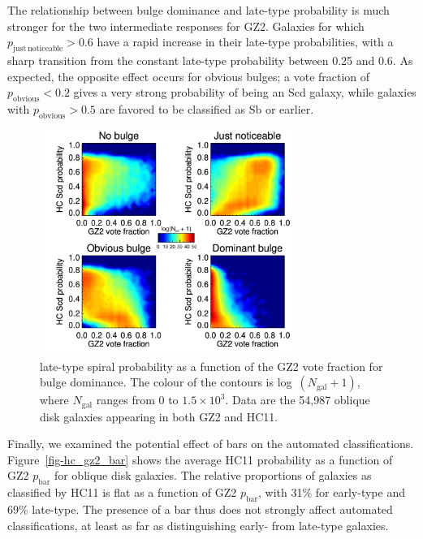 \documentclass[useAMS,usenatbib]{mn2e}
\begin{document}
The relationship between bulge dominance and late-type probability is much stronger for the two intermediate responses for GZ2. Galaxies for which $p_\mathrm{just~noticeable}>0.6$ have a rapid increase in their late-type probabilities, with a sharp transition from the constant late-type probability between 0.25 and 0.6. As expected, the opposite effect occurs for obvious bulges; a vote fraction of $p_\mathrm{obvious}<0.2$ gives a very strong probability of being an Scd galaxy, while galaxies with $p_\mathrm{obvious}>0.5$ are favored to be classified as Sb or earlier. 

\begin{figure}
\includegraphics[angle=0,width=3.3in]{figures/hc_gz2_bulge_contour.pdf}
\caption{\citet{hue11} late-type spiral probability as a function of the GZ2 vote fraction for bulge dominance. The colour of the contours is log~$(N_\mathrm{gal} + 1)$, where $N_\mathrm{gal}$ ranges from 0 to $1.5\times10^3$. Data are the 54,987 oblique disk galaxies appearing in both GZ2 and HC11.
\label{fig-hc_gz2_bulge_contour}}
\end{figure}

Finally, we examined the potential effect of bars on the automated classifications. Figure~\ref{fig-hc_gz2_bar} shows the average HC11 probability as a function of GZ2 $p_\mathrm{bar}$ for oblique disk galaxies. The relative proportions of galaxies as classified by HC11 is flat as a function of GZ2 $p_\mathrm{bar}$, with 31\% for early-type and 69\% late-type. The presence of a bar thus does not strongly affect automated classifications, at least as far as distinguishing early- from late-type galaxies. 
\end{document}
